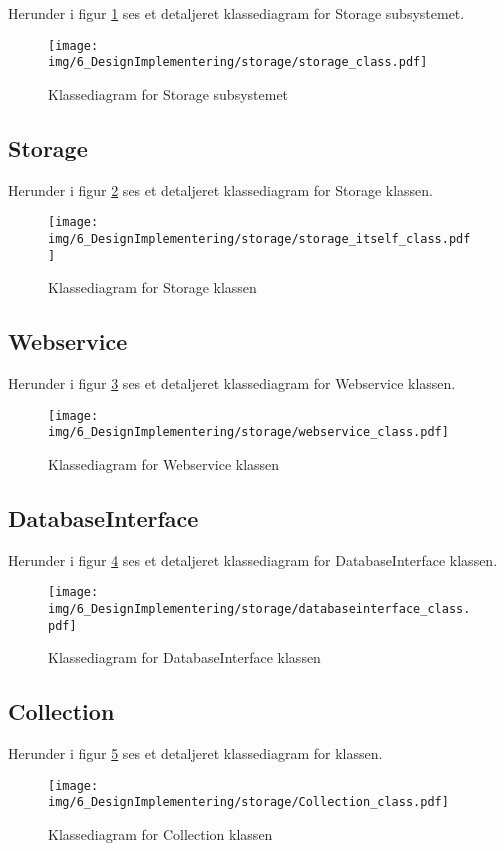 \begin{appendices}
Herunder i figur \ref{fig:storage_subsystem_class} ses et detaljeret klassediagram for Storage subsystemet.

\begin{figure}[H]
	\centering
	\texttt{[image: img/6\_DesignImplementering/storage/storage\_class.pdf]}
	\caption{Klassediagram for Storage subsystemet}
	\label{fig:storage_subsystem_class}
\end{figure}

\pagebreak
\subsection{Storage}
Herunder i figur \ref{fig:storage_class} ses et detaljeret klassediagram for Storage klassen.

\begin{figure}[H]
	\centering
	\texttt{[image: img/6\_DesignImplementering/storage/storage\_itself\_class.pdf]}
	\caption{Klassediagram for Storage klassen}
	\label{fig:storage_class}
\end{figure}

\pagebreak
\subsection{Webservice}

Herunder i figur \ref{fig:webservice_class} ses et detaljeret klassediagram for Webservice klassen.
\begin{figure}[H]
	\centering
	\texttt{[image: img/6\_DesignImplementering/storage/webservice\_class.pdf]}
	\caption{Klassediagram for Webservice klassen}
	\label{fig:webservice_class}
\end{figure}

\pagebreak
\subsection{DatabaseInterface}

Herunder i figur \ref{fig:DatabaseInterface_class} ses et detaljeret klassediagram for DatabaseInterface klassen.
\begin{figure}[H]
	\centering
	\texttt{[image: img/6\_DesignImplementering/storage/databaseinterface\_class.pdf]}
	\caption{Klassediagram for DatabaseInterface klassen}
	\label{fig:DatabaseInterface_class}
\end{figure}

\pagebreak
\subsection{Collection}
Herunder i figur \ref{fig:Collection_class} ses et detaljeret klassediagram for  klassen.
\begin{figure}[H]
	\centering
	\texttt{[image: img/6\_DesignImplementering/storage/Collection\_class.pdf]}
	\caption{Klassediagram for Collection klassen}
	\label{fig:Collection_class}
\end{figure}


\end{appendices}
